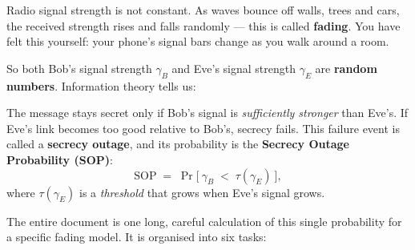 \documentclass[11pt]{article}
\begin{document}
Radio signal strength is not constant. As waves bounce off walls, trees and cars, the
received strength rises and falls randomly --- this is called \textbf{fading}. You have
felt this yourself: your phone's signal bars change as you walk around a room.

So both Bob's signal strength $\gamma_B$ and Eve's signal strength $\gamma_E$ are
\textbf{random numbers}. Information theory tells us:

\begin{ideabox}
The message stays secret only if Bob's signal is \emph{sufficiently stronger} than
Eve's. If Eve's link becomes too good relative to Bob's, secrecy fails. This failure
event is called a \textbf{secrecy outage}, and its probability is the
\textbf{Secrecy Outage Probability (SOP)}:
\[
\mathrm{SOP} \;=\; \Pr\Big[\ \gamma_B \;<\; \tau(\gamma_E)\ \Big],
\]
where $\tau(\gamma_E)$ is a \emph{threshold} that grows when Eve's signal grows.
\end{ideabox}

The entire document is one long, careful calculation of this single probability for a
specific fading model. It is organised into six tasks:

\begin{center}
\end{center}

\end{document}
